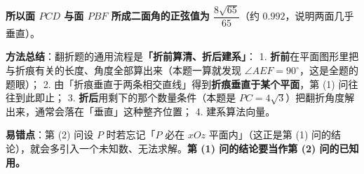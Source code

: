 \begin{answer}
\textbf{所以面 $PCD$ 与面 $PBF$ 所成二面角的正弦值为 $\dfrac{8\sqrt{65}}{65}$}（约 $0.992$，说明两面几乎垂直）。

\begin{gktip}
\textbf{方法总结}：翻折题的通用流程是\textbf{「折前算清、折后建系」}：
1. \textbf{折前}在平面图形里把与折痕有关的长度、角度全部算出来（本题一算就发现 $\angle AEF=90^{\circ}$，这是全题的题眼）；
2. 由「折痕垂直于两条相交直线」得到\textbf{折痕垂直于某个平面}，第 (1) 问往往到此即止；
3. \textbf{折后}用剩下的那个数量条件（本题是 $PC=4\sqrt3$）把翻折角度解出来，通常会落在「垂直」这种整齐位置；
4. 建系算法向量。

\textbf{易错点}：第 (2) 问设 $P$ 时若忘记「$P$ 必在 $xOz$ 平面内」（这正是第 (1) 问的结论），就会多引入一个未知数、无法求解。\textbf{第 (1) 问的结论要当作第 (2) 问的已知用。}
\end{gktip}



\par\medskip

\end{answer}
